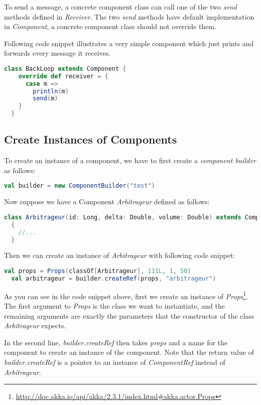 To send a message, a concrete component class can call one of the two \emph{send} methods defined in \emph{Receiver}. The two \emph{send} methods have default implementation in \emph{Component}, a concrete component class should not override them.

Following code snippet illustrates a very simple component which just prints and forwards every message it receives.

\begin{lstlisting}[language=Scala]
  class BackLoop extends Component {
    override def receiver = {
      case m =>
        println(m)
        send(m)
    }
  }
\end{lstlisting}

\subsection{Create Instances of Components}

To create an instance of a component, we have to first create a \emph{component builder} as follows:

\begin{lstlisting}[language=Scala]
val builder = new ComponentBuilder("test")
\end{lstlisting}

Now suppose we have a Component \emph{Arbitrageur} defined as follows:

\begin{lstlisting}[language=Scala]
  class Arbitrageur(id: Long, delta: Double, volume: Double) extends Component
  {
    //...
  }
\end{lstlisting}

Then we can create an instance of \emph{Arbitrageur} with following code snippet:

\begin{lstlisting}[language=Scala]
  val props = Props(classOf[Arbitrageur], 111L, 1, 50)
  val arbitrageur = builder.createRef(props, "arbitrageur")
\end{lstlisting}

As you can see in the code snippet above, first we create an instance of \emph{Props}\footnote{\url{http://doc.akka.io/api/akka/2.3.1/index.html\#akka.actor.Props}}. The first argument to \emph{Props} is the class we want to instantiate, and the remaining arguments are exactly the parameters that the constructor of the class \emph{Arbitrageur} expects.

In the second line, \emph{builder.createRef} then takes \emph{props} and a name for the component to create an instance of the component. Note that the return value of \emph{builder.createRef} is a pointer to an instance of \emph{ComponentRef} instead of \emph{Arbitrageur}.


